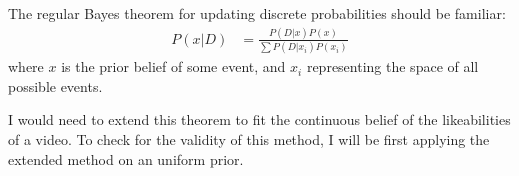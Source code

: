 \documentclass[a4paper,11pt]{article}
\begin{document}

The regular Bayes theorem for updating discrete probabilities should be familiar:
\begin{align*}
    P(x|D) &= \frac{P(D|x) P(x)}{\sum P(D|x_i) P(x_i) }
\end{align*}
where $x$ is the prior belief of some event, and $x_i$ representing the space of all possible events.


I would need to extend this theorem to fit the continuous belief of the likeabilities of a video. To check for the validity of this method, I will be first applying the extended method on an uniform prior.
\end{document}
